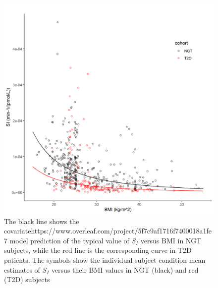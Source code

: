 \documentclass[utf8]{frontiersSCNS} %
\begin{document}
\begin{figure}[h!]
\begin{center}
\includegraphics[width=15cm]{SI_BMI.PNG}
\end{center}
\caption{The black line shows the covariatehttps://www.overleaf.com/project/5f7c9af1716f7400018a1fe7 model prediction of the typical value of $S_I$ versus BMI in NGT subjects, while the red line is the corresponding curve in T2D patients. The symbols show the individual subject condition mean estimates of $S_I$ versus their BMI values in NGT (black) and red (T2D) subjects}
\label{fig: SI_BMI}
\end{figure}

\end{document}

